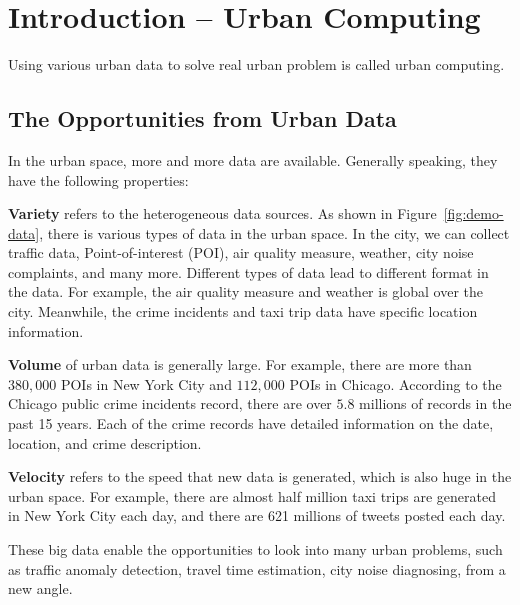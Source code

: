 \chapter{Introduction -- Urban Computing} \label{chapter1:introduction}



Using various urban data to solve real urban problem is called urban computing.



\section{The Opportunities from Urban Data}


In the urban space, more and more  data are available. Generally speaking, they have the following properties:

\textbf{Variety} refers to the heterogeneous data sources. As shown in Figure~\ref{fig:demo-data}, there is various types of data in the urban space. In the city, we can collect traffic data, Point-of-interest (POI), air quality measure, weather,  city noise complaints, and many more. Different types of data lead to different format in the data. For example, the air quality measure and weather is global over the city. Meanwhile, the crime incidents and taxi trip data have specific location information.


\textbf{Volume} of urban data is generally large. For example, there are more than $380,000$ POIs in New York City and $112,000$ POIs in Chicago. According to the Chicago public crime incidents record, there are over $5.8$ millions of records in the past 15 years. Each of the crime records have detailed information on the date, location, and crime description. 


\textbf{Velocity} refers to the speed that new data is generated, which is also huge in the urban space. For example, there are almost half million taxi trips are generated in New York City each day, and there are 621 millions of tweets posted each day.

These big data enable the opportunities to look into many urban problems, such as traffic anomaly detection,  travel time estimation, city noise diagnosing, from a new angle.


